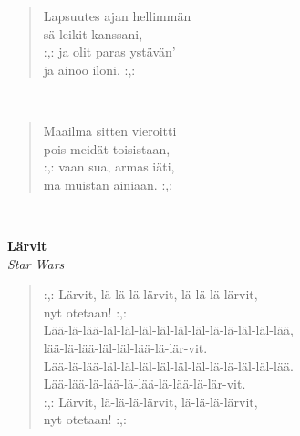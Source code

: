 \noindent\begin{minipage}{\linewidth}
\begin{verse}
	Lapsuutes ajan hellimmän\\
	sä leikit kanssani,\\
	\hspace{0pt-\widthof{:,: }}:,: ja olit paras ystävän'\\
	ja ainoo iloni. :,:\\
\end{verse}
\end{minipage}\\[10pt]
\noindent\begin{minipage}{\linewidth}
\begin{verse}
	Maailma sitten vieroitti\\
	pois meidät toisistaan,\\
	\hspace{0pt-\widthof{:,: }}:,: vaan sua, armas iäti,\\
	ma muistan ainiaan. :,:\\
\end{verse}
\end{minipage}\\[10pt]
%
%
\noindent\begin{minipage}{\linewidth}
\vspace{5pt}
\parbox[t]{0.85\linewidth}{\raggedright {\large\bf Lärvit}\\[2pt]\small\emph{Star Wars}\\[6pt]}
\begin{verse}
	
	\hspace{0pt-\widthof{:,: }}:,: Lärvit, lä-lä-lä-lärvit, lä-lä-lä-lärvit,\\
	nyt otetaan! :,:\\
	Lää-lä-lää-läl-läl-läl-läl-läl-läl-lä-lä-läl-läl-lää,\\
	lää-lä-lää-läl-läl-lää-lä-lär-vit.\\
	Lää-lä-lää-läl-läl-läl-läl-läl-läl-lä-lä-läl-läl-lää.\\
	Lää-lää-lä-lää-lä-lää-lä-lää-lä-lär-vit.\\
	\hspace{0pt-\widthof{:,: }}:,: Lärvit, lä-lä-lä-lärvit, lä-lä-lä-lärvit,\\
	nyt otetaan! :,:\\
\end{verse}
\end{minipage}\\[10pt]
